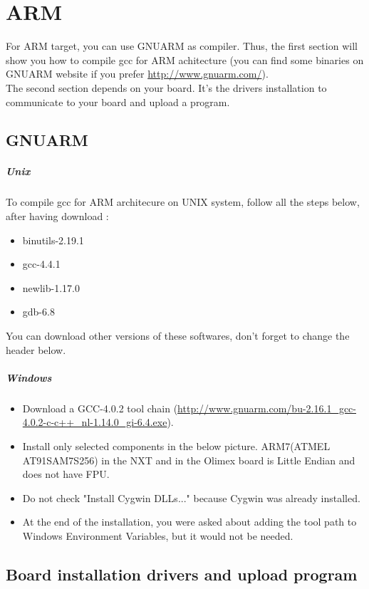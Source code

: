 %
%

\newpage
\section{ARM}
For ARM target, you can use GNUARM as compiler. Thus, the first section will show you how to compile gcc for ARM achitecture (you can find some binaries on GNUARM website if you prefer \href{http://www.gnuarm.com/}{http://www.gnuarm.com/}).\\
The second section depends on your board. It's the drivers installation to communicate to your board and upload a program.\\

\subsection{GNUARM}
\subparagraph{Unix}
To compile gcc for ARM architecure on UNIX system, follow all the steps below, after having download :
\begin{itemize}
\item binutils-2.19.1
\item gcc-4.4.1
\item newlib-1.17.0
\item gdb-6.8
\end{itemize}

You can download other versions of these softwares, don't forget to change the header below.\


\subparagraph{Windows}
\begin{itemize}
\item Download a GCC-4.0.2 tool chain (\href{http://www.gnuarm.com/bu-2.16.1_gcc-4.0.2-c-c++_nl-1.14.0_gi-6.4.exe}{http://www.gnuarm.com/bu-2.16.1_gcc-4.0.2-c-c++_nl-1.14.0_gi-6.4.exe}).
\item Install only selected components in the below picture. ARM7(ATMEL AT91SAM7S256) in the NXT and in the Olimex board is Little Endian and does not have FPU.
\item Do not check "Install Cygwin DLLs..." because Cygwin was already installed.\\
\item At the end of the installation, you were asked about adding the tool path to Windows Environment Variables, but it would not be needed.
\end{itemize}


\subsection{Board installation drivers and upload program}






